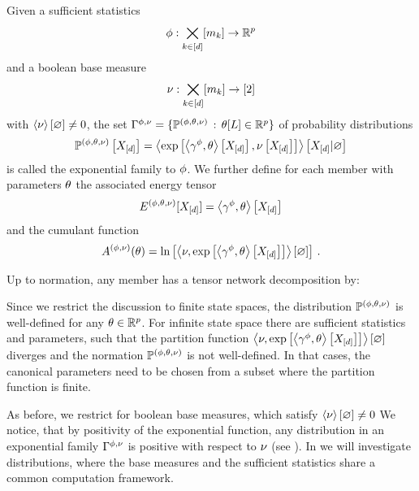 \begin{definition}
    \label{def:expFamily}
    Given a sufficient statistics
    \[ \phi : \bigtimes_{k\in[d]}[m_{k}] \rightarrow \mathbb{R}^{p}\]
    and a boolean base measure
    \[ \nu : \bigtimes_{k\in[d]}[m_{k}] \rightarrow [2] \]
    with $\left\langle \nu\right\rangle \left[ \varnothing \right]\neq0$,  the set $\Gamma^{\phi,\nu}=\{\mathbb{P}^{(\phi,\theta,\nu)} \, : \, \theta[L] \in \mathbb{R}^{p}\}$ of probability distributions
    \[ \mathbb{P}^{(\phi,\theta,\nu)}\left[X_{[d]}\right] = \left\langle \mathrm{exp}\left[\left\langle \gamma^{\phi},\theta\right\rangle \left[ X_{[d]} \right],\nu\left[X_{[d]}\right]\right]\right\rangle \left[ X_{[d]} | \varnothing \right] \]
    is called the exponential family to $\phi$.
    We further define for each member with parameters $\theta$ the associated energy tensor
    \[ E^{(\phi,\theta,\nu)}[X_{[d]}] = \left\langle \gamma^{\phi},\theta\right\rangle \left[ X_{[d]} \right] \]
    and the cumulant function
    \[ A^{(\phi,\nu)}(\theta) = \ln \left[ \left\langle \nu,\mathrm{exp}\left[\left\langle \gamma^{\phi},\theta\right\rangle \left[ X_{[d]} \right] \right]\right\rangle \left[ \varnothing \right]  \right] \, .\]
\end{definition}

Up to normation, any member has a tensor network decomposition by:
\begin{center}
    
\end{center}


Since we restrict the discussion to finite state spaces, the distribution $\mathbb{P}^{(\phi,\theta,\nu)}$ is well-defined for any $\theta\in\mathbb{R}^{p}$.
For infinite state space there are sufficient statistics and parameters, such that the partition function $\left\langle \nu,\mathrm{exp}\left[\left\langle \gamma^{\phi},\theta\right\rangle \left[ X_{[d]} \right]\right]\right\rangle \left[ \varnothing \right]$ diverges and the normation $\mathbb{P}^{(\phi,\theta,\nu)}$ is not well-defined.
In that cases, the canonical parameters need to be chosen from a subset where the partition function is finite.

As before, we restrict for boolean base measures, which satisfy $\left\langle \nu\right\rangle \left[ \varnothing \right]\neq0$
We notice, that by positivity of the exponential function, any distribution in an exponential family $\Gamma^{\phi,\nu}$ is positive with respect to $\nu$ (see ).
In  we will investigate distributions, where the base measures and the sufficient statistics share a common computation framework.


